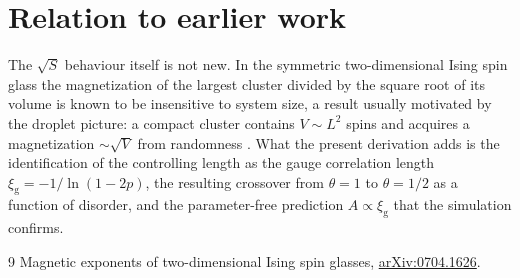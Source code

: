 \documentclass[11pt]{article}
\theoremstyle{remark}
\newcommand{\xig}{\xi_{\mathrm{g}}}
\begin{document}
\section{Relation to earlier work}

The $\sqrt{S}$ behaviour itself is not new. In the symmetric two-dimensional Ising spin
glass the magnetization of the largest cluster divided by the square root of its volume is
known to be insensitive to system size, a result usually motivated by the droplet picture:
a compact cluster contains $V \sim L^{2}$ spins and acquires a magnetization $\sim\sqrt{V}$
from randomness \cite{magnetic-exponents}. What the present derivation adds is the
identification of the controlling length as the gauge correlation length
$\xig = -1/\ln(1-2p)$, the resulting crossover from $\theta = 1$ to $\theta = 1/2$ as a
function of disorder, and the parameter-free prediction $A \propto \xig$ that the
simulation confirms.

\begin{thebibliography}{9}
Magnetic exponents of two-dimensional Ising spin glasses,
\href{https://arxiv.org/abs/0704.1626}{arXiv:0704.1626}.
\end{thebibliography}
\end{document}
